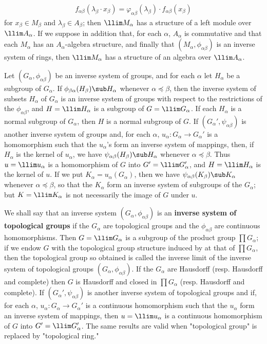 \begin{align}\label{inverse limit ring and module}
f_{\alpha\beta}(\lambda_\beta\cdot x_\beta)=\varphi_{\alpha\beta}(\lambda_\beta)\cdot f_{\alpha\beta}(x_\beta)
\end{align}
for $x_\beta\in M_\beta$ and $\lambda_\beta\in A_\beta$; then $\llim M_\alpha$ has a structure of a left module over $\llim A_\alpha$. If we suppose in addition that, for each $\alpha$, $A_\alpha$ is commutative and that each $M_\alpha$ has an $A_\alpha$-algebra structure, and finally that $(M_\alpha,\phi_{\alpha\beta})$ is an inverse system of rings, then $\llim M_\alpha$ has a structure of an algebra over $\llim A_\alpha$.\par
Let $(G_\alpha,\phi_{\alpha\beta})$ be an inverse system of groups, and for each $\alpha$ let $H_\alpha$ be a subgroup of $G_\alpha$. If $\phi_{\beta\alpha}(H_\beta)\sub H_\alpha$ whenever $\alpha\preceq\beta$, then the inverse system of subsets $H_\alpha$ of $G_\alpha$ is an inverse system of groups with respect to the restrictions of the $\phi_{\alpha\beta}$, and $H=\llim H_\alpha$ is a subgroup of $G=\llim G_\alpha$. If each $H_\alpha$ is a normal subgroup of $G_\alpha$, then $H$ is a normal subgroup of $G$. If $(G_\alpha',\psi_{\alpha\beta})$ is another inverse system of groups and, for each $\alpha$, $u_\alpha:G_\alpha\to G_\alpha'$ is a homomorphism such that the $u_\alpha$'s form an inverse system of mappings, then, if $H_\alpha$ is the kernel of $u_\alpha$, we have $\psi_{\alpha\beta}(H_\beta)\sub H_\alpha$ whenever $\alpha\preceq\beta$. Thus $u=\llim u_\alpha$ is a homomorphism of $G$ into $G'=\llim G_\alpha'$, and $H=\llim H_\alpha$ is the kernel of $u$. If we put $K_\alpha=u_\alpha(G_\alpha)$, then we have $\psi_{\alpha\beta}(K_\beta)\sub K_\alpha$ whenever $\alpha\preceq\beta$, so that the $K_\alpha$ form an inverse system of subgroups of the $G_\alpha$; but $K=\llim K_\alpha$ is not necessarily the image of $G$ under $u$.\par
We shall say that an inverse system $(G_\alpha,\phi_{\alpha\beta})$ is an \textbf{inverse system of topological groups} if the $G_\alpha$ are topological groups and the $\phi_{\alpha\beta}$ are continuous homomorphisms. Then $G=\llim G_\alpha$ is a subgroup of the product group $\prod G_\alpha$; if we endow $G$ with the topological group structure induced by at that of $\prod G_\alpha$, then the topological group so obtained is called the inverse limit of the inverse system of topological groups $(G_\alpha,\phi_{\alpha\beta})$. If the $G_\alpha$ are Hausdorff (resp. Hausdorff and complete) then $G$ is Hausdorff and closed in $\prod G_\alpha$ (resp. Hausdorff and complete). If $(G_\alpha',\psi_{\alpha\beta})$ is another inverse system of topological groups and if, for each $\alpha$, $u_\alpha:G_\alpha\to G_\alpha'$ is a continuous homomorphism such that the $u_\alpha$ form an inverse system of mappings, then $u=\llim u_\alpha$ is a continuous homomorphism of $G$ into $G'=\llim G_\alpha'$. The same results are valid when "topological group" is replaced by "topological ring."\par
